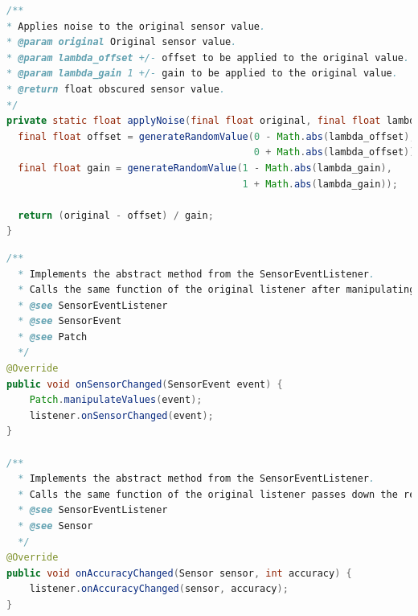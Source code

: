 \documentclass[11pt,
  oneside,openany,    %
]{scrreprt}
\begin{document}
\begin{lstlisting}[language=java, caption=Random Value Generation Function, label=lst:value_gen_func]
/**
* Applies noise to the original sensor value.
* @param original Original sensor value.
* @param lambda_offset +/- offset to be applied to the original value.
* @param lambda_gain 1 +/- gain to be applied to the original value.
* @return float obscured sensor value.
*/
private static float applyNoise(final float original, final float lambda_offset, final float lambda_gain) {
  final float offset = generateRandomValue(0 - Math.abs(lambda_offset), 
                                           0 + Math.abs(lambda_offset));
  final float gain = generateRandomValue(1 - Math.abs(lambda_gain), 
                                         1 + Math.abs(lambda_gain));
 
  return (original - offset) / gain;
}
\end{lstlisting}
\pagebreak
\begin{lstlisting}[language=java, caption=SensorEventListener Methods, label=lst:patchlistener]
/**
  * Implements the abstract method from the SensorEventListener.
  * Calls the same function of the original listener after manipulating the received SensorEvent and passes is down.
  * @see SensorEventListener
  * @see SensorEvent
  * @see Patch
  */
@Override
public void onSensorChanged(SensorEvent event) {
    Patch.manipulateValues(event);
    listener.onSensorChanged(event);
}

/**
  * Implements the abstract method from the SensorEventListener.
  * Calls the same function of the original listener passes down the received parameters.
  * @see SensorEventListener
  * @see Sensor
  */
@Override
public void onAccuracyChanged(Sensor sensor, int accuracy) {
    listener.onAccuracyChanged(sensor, accuracy);
}
\end{lstlisting}
\pagebreak
\end{document}
